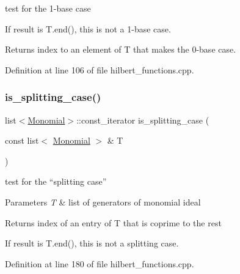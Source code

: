 test for the 1-\/base case \cite{Bigatti97} 

If result is {\ttfamily T.\+end()}, this is not a 1-\/base case. \begin{DoxyReturn}{Returns}
index to an element of {\ttfamily T} that makes the 0-\/base case. 
\end{DoxyReturn}


Definition at line 106 of file hilbert\+\_\+functions.\+cpp.

\mbox{\label{group__commalg_ga26c5ece1df1c4db4873925f41ed8ee9c}} 
\subsubsection{\texorpdfstring{is\+\_\+splitting\+\_\+case()}{is\_splitting\_case()}}
{\footnotesize\ttfamily list$<$\hyperlink{group__polygroup_class_monomial}{Monomial}$>$\+::const\+\_\+iterator is\+\_\+splitting\+\_\+case (\begin{DoxyParamCaption}\item[{const list$<$ \hyperlink{group__polygroup_class_monomial}{Monomial} $>$ \&}]{T }\end{DoxyParamCaption})}



test for the ``splitting case'' \cite{Bigatti97} 


\begin{DoxyParams}{Parameters}
{\em T} & list of generators of monomial ideal \\
\hline
\end{DoxyParams}
\begin{DoxyReturn}{Returns}
index of an entry of {\ttfamily T} that is coprime to the rest
\end{DoxyReturn}
If result is {\ttfamily T.\+end()}, this is not a splitting case. 

Definition at line 180 of file hilbert\+\_\+functions.\+cpp.

\mbox{\label{group__commalg_gabf201296cecf6c31675c7e23bb58dbb4}} 
